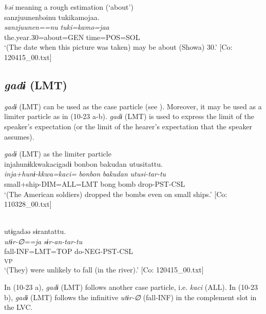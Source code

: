   \ex  \textit{bəi} meaning a rough estimation (‘about’)\\
      \glll    {\textbar}sanzjuunen{\textbar}bəinu  tukikamojaa.\\
      \textit{sanzjuunen==nu}  \textit{tuki=kamo=jaa}\\
      the.year.30=about=GEN  time=POS=SOL\\
      \glt       ‘(The date when this picture was taken) may be about (Showa) 30.’ [Co: 120415\_00.txt]
    \z
\z

\subsection{\textit{gadɨ} (LMT)}\label{sec:10.1.5}

\textit{gadɨ} (LMT) can be used as the case particle (see ). Moreover, it may be used as a limiter particle as in (10-23 a-b). \textit{gadɨ} (LMT) is used to express the limit of the speaker’s expectation (or the limit of the hearer’s expectation that the speaker assumes).

\ea\label{ex:10.23}   \textit{gadɨ} (LMT) as the limiter particle\\
    \ea%
      \glll    injahunɨkkwakacigadɨ  {\textbar}bonbon  bakudan  utusi{\textbar}tattu.\\
      \textit{inja+hunɨ-kkwa=kaci=}  \textit{bonbon}  \textit{bakudan}  \textit{utusi-tar-tu}\\
      small+ship-DIM=ALL=LMT  bong  bomb  drop-PST-CSL\\
      \glt       ‘(The American soldiers) dropped the bombs even on small ships.’ [Co: 110328\_00.txt]

  \ex{}\\
      \gllll    utɨgadəə  sɨrantattu.\\
      \textit{utɨr-∅==ja}  \textit{sɨr-an-tar-tu}\\
      fall-INF=LMT=TOP  do-NEG-PST-CSL\\
      [Complement  LV]\textsubscript{VP}\\
      \glt ‘(They) were unlikely to fall (in the river).’    [Co: 120415\_00.txt]
    \z
\z

In (10-23 a), \textit{gadɨ} (LMT) follows another case particle, i.e. \textit{kaci} (ALL). In (10-23 b), \textit{gadɨ} (LMT) follows the infinitive \textit{utɨr-∅} (fall-INF) in the complement slot in the LVC.

